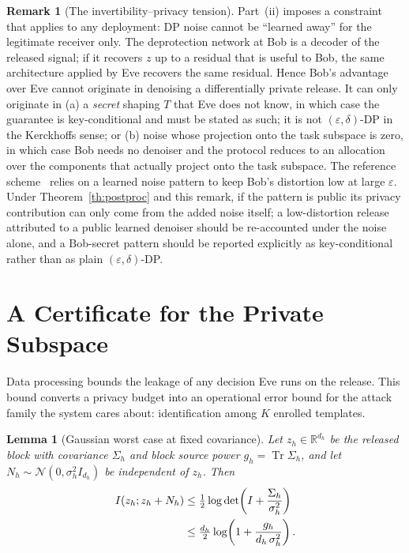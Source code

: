 \documentclass[10pt,twocolumn,letterpaper]{article}
\theoremstyle{plain}
\newtheorem{lemma}{Lemma}
\theoremstyle{definition}
\newtheorem{remark}{Remark}
\begin{document}
\begin{remark}[The invertibility--privacy tension]
\label{rm:tension}
Part~(ii) imposes a constraint that applies to any deployment: DP noise cannot
be ``learned away'' for the legitimate receiver only. The deprotection network
at Bob is a decoder of the released signal; if it recovers $z$ up to a residual
that is useful to Bob, the same architecture applied by Eve recovers the same
residual. Hence Bob's advantage over Eve cannot originate in denoising a
differentially private release. It can only originate in
(a) a \emph{secret} shaping $T$ that Eve does not know, in which case the
guarantee is key-conditional and must be stated as such; it is not
$(\varepsilon,\delta)$-DP in the Kerckhoffs sense; or
(b) noise whose projection onto the task subspace is zero, in which case Bob
needs no denoiser and the protocol reduces to an allocation over the
components that actually project onto the task subspace.
The reference scheme~\cite{arXiv2510} relies on a learned noise pattern to
keep Bob's distortion low at large $\varepsilon$. Under
Theorem~\ref{th:postproc} and this remark, if the pattern is public its privacy
contribution can only come from the added noise itself; a low-distortion release
attributed to a public learned denoiser should be re-accounted under the noise
alone, and a Bob-secret pattern should be reported explicitly as key-conditional
rather than as plain $(\varepsilon,\delta)$-DP.
\end{remark}

\section{A Certificate for the Private Subspace}
\label{sec:certificate}

Data processing bounds the leakage of any decision Eve runs on the release.
This bound converts a privacy budget into an operational error bound for the
attack family the system cares about: identification among $K$ enrolled
templates.

\begin{lemma}[Gaussian worst case at fixed covariance]
\label{lm:maxent}
Let $z_h\in\mathbb{R}^{d_h}$ be the released block with covariance $\Sigma_h$
and block source power $g_h=\operatorname{Tr}\Sigma_h$, and let
$N_h\sim\mathcal{N}(0,\sigma_h^{2}I_{d_h})$ be independent of $z_h$. Then
\begin{align}
I(z_h;z_h+N_h)
&\le\tfrac12\log\det\!\left(I+\frac{\Sigma_h}{\sigma_h^{2}}\right)\notag\\
&\le\tfrac{d_h}{2}\log\!\left(1+\frac{g_h}{d_h\,\sigma_h^{2}}\right).
\label{eq:maxent}
\end{align}
\end{lemma}
\end{document}
